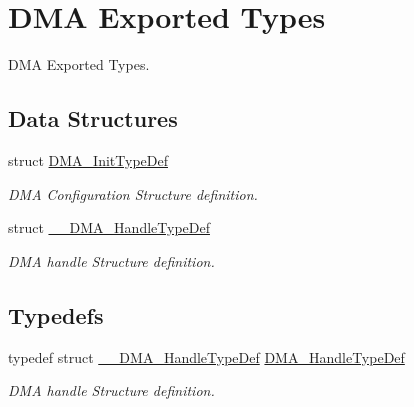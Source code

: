 \hypertarget{group___d_m_a___exported___types}{}\section{D\+MA Exported Types}
\label{group___d_m_a___exported___types}


D\+MA Exported Types.  


\subsection*{Data Structures}
\begin{DoxyCompactItemize}
\item 
struct \hyperlink{struct_d_m_a___init_type_def}{D\+M\+A\+\_\+\+Init\+Type\+Def}
\begin{DoxyCompactList}\small\item\em D\+MA Configuration Structure definition. \end{DoxyCompactList}\item 
struct \hyperlink{struct_____d_m_a___handle_type_def}{\+\_\+\+\_\+\+D\+M\+A\+\_\+\+Handle\+Type\+Def}
\begin{DoxyCompactList}\small\item\em D\+MA handle Structure definition. \end{DoxyCompactList}\end{DoxyCompactItemize}
\subsection*{Typedefs}
\begin{DoxyCompactItemize}
\item 
\mbox{\label{group___d_m_a___exported___types_ga41b754a906b86bce54dc79938970138b}} 
typedef struct \hyperlink{struct_____d_m_a___handle_type_def}{\+\_\+\+\_\+\+D\+M\+A\+\_\+\+Handle\+Type\+Def} \hyperlink{group___d_m_a___exported___types_ga41b754a906b86bce54dc79938970138b}{D\+M\+A\+\_\+\+Handle\+Type\+Def}
\begin{DoxyCompactList}\small\item\em D\+MA handle Structure definition. \end{DoxyCompactList}\end{DoxyCompactItemize}
